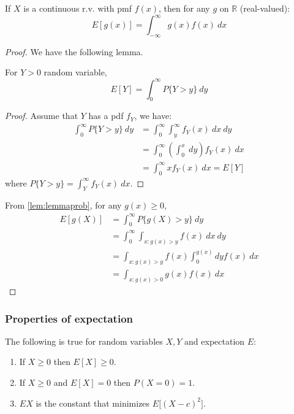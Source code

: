 \begin{proposition}
    If $X$ is a continuous r.v. with pmf $f(x)$, then for any $g$ on $\mathbb{R}$ (real-valued): \begin{equation}
        E[g(x)] = \int_{-\infty}^{\infty} g(x)f(x) \: dx
    \end{equation}
\end{proposition}
\begin{proof}
    We have the following lemma.
    \begin{lemma}\label{lem:lemmaprob}
        For $Y>0$ random variable, 
        \begin{equation}
            E[Y] = \int_{0}^{\infty} P\{Y > y\} \: dy
        \end{equation}
    \end{lemma}
    \begin{proof}
        Assume that $Y$ has a pdf $f_{Y}$, we have: \begin{equation}
            \begin{split}
                \int_{0}^{\infty} P\{Y > y\} \: dy &= \int_{0}^{\infty}\int_{y}^{\infty} f_{Y}(x) \:dx \: dy\\
                & = \int_{0}^{\infty} \left(\int_{0}^{x} \: dy\right) f_{Y}(x) \: dx\\
                & = \int_{0}^{\infty} xf_{Y}(x)\: dx = E[Y]
            \end{split}
        \end{equation}
        where $P\{Y>y\}=\int_{Y}^{\infty}f_{Y}(x)\:dx$. 
    \end{proof}
    From \ref{lem:lemmaprob}, for any $g(x)\geq 0$, 
    \begin{equation}
        \begin{split}
            E[g(X)] & = \int_{0}^{\infty} P\{g(X)>y\}\: dy\\
            & = \int_{0}^{\infty} \int_{x: g(x)>y} f(x)\:dx\:dy\\
            & = \int_{x: g(x)>y} f(x)\int_{0}^{g(x)} dyf(x)\:dx\\
            & = \int_{x:g(x)>0} g(x)f(x) \: dx
        \end{split}
    \end{equation}
\end{proof}
\subsubsection{Properties of expectation}
\begin{theorem}
    The following is true for random variables $X,Y$ and expectation $E$:
    \begin{enumerate}
        \item If $X\geq 0$ then $E[X]\geq 0$. 
        \item If $X\geq 0 $ and $E[X]=0$ then $P(X=0)=1$. 
        \item $E{X}$ is the constant that minimizes $E\Big[(X-c)^2\Big]$. 
    \end{enumerate}
\end{theorem}
